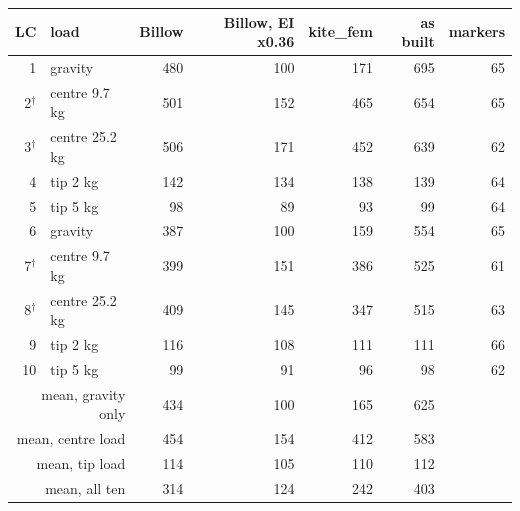 \begin{tabular}{rl rrrr r}
\toprule
LC & load & Billow & Billow, EI x0.36 & kite\_fem & as built & markers \\
\midrule
1 & gravity & 480 & 100 & 171 & 695 & 65 \\
2$^{\dagger}$ & centre 9.7 kg & 501 & 152 & 465 & 654 & 65 \\
3$^{\dagger}$ & centre 25.2 kg & 506 & 171 & 452 & 639 & 62 \\
4 & tip 2 kg & 142 & 134 & 138 & 139 & 64 \\
5 & tip 5 kg & 98 & 89 & 93 & 99 & 64 \\
6 & gravity & 387 & 100 & 159 & 554 & 65 \\
7$^{\dagger}$ & centre 9.7 kg & 399 & 151 & 386 & 525 & 61 \\
8$^{\dagger}$ & centre 25.2 kg & 409 & 145 & 347 & 515 & 63 \\
9 & tip 2 kg & 116 & 108 & 111 & 111 & 66 \\
10 & tip 5 kg & 99 & 91 & 96 & 98 & 62 \\
\midrule
\multicolumn{2}{r}{mean, gravity only} & 434 & 100 & 165 & 625 & \\
\multicolumn{2}{r}{mean, centre load} & 454 & 154 & 412 & 583 & \\
\multicolumn{2}{r}{mean, tip load} & 114 & 105 & 110 & 112 & \\
\multicolumn{2}{r}{mean, all ten} & 314 & 124 & 242 & 403 & \\
\bottomrule
\end{tabular}
